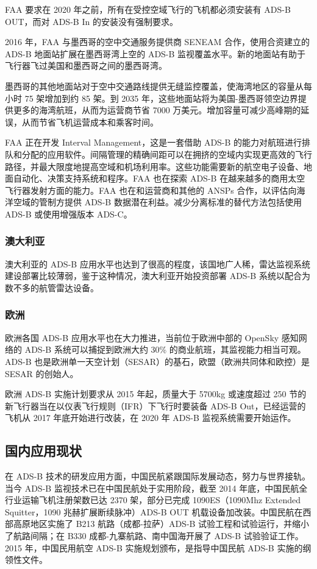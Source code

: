 FAA 要求在 2020 年之前，所有在受控空域飞行的飞机都必须安装有 ADS-B OUT，而对 ADS-B In 的安装没有强制要求。

2016 年，FAA 与墨西哥的空中交通服务提供商 SENEAM 合作，使用合资建立的 ADS-B 地面站扩展在墨西哥湾上空的 ADS-B 监视覆盖水平。新的地面站有助于飞行器飞过美国和墨西哥之间的墨西哥湾。

墨西哥的其他地面站对于空中交通路线提供无缝监控覆盖，使海湾地区的容量从每小时 75 架增加到约 85 架。到 2035 年，这些地面站将为美国-墨西哥领空边界提供更多的海湾航班，从而为运营商节省 7000 万美元。增加容量可减少高峰期的延误，从而节省飞机运营成本和乘客时间。

FAA 正在开发 Interval Management，这是一套借助 ADS-B 的能力对航班进行排队和分配的应用软件。间隔管理的精确间距可以在拥挤的空域内实现更高效的飞行路径，并最大限度地提高空域和机场利用率。这些功能需要新的航空电子设备、地面自动化、决策支持系统和程序。FAA 也在探索 ADS-B 在越来越多的商用太空飞行器发射方面的能力。FAA 也在和运营商和其他的 ANSPs 合作，以评估向海洋空域的管制方提供 ADS-B 数据潜在利益。减少分离标准的替代方法包括使用 ADS-B 或使用增强版本 ADS-C。

\subsubsection{澳大利亚}

澳大利亚的 ADS-B 应用水平也达到了很高的程度，该国地广人稀，雷达监视系统建设部署比较薄弱，鉴于这种情况，澳大利亚开始投资部署 ADS-B 系统以配合为数不多的航管雷达设备。

\subsubsection{欧洲}

欧洲各国 ADS-B 应用水平也在大力推进，当前位于欧洲中部的 OpenSky 感知网络的 ADS-B 系统可以捕捉到欧洲大约 30\% 的商业航班，其监视能力相当可观。ADS-B 也是欧洲单一天空计划（SESAR）的基石，欧盟（欧洲共同体和欧控）是 SESAR 的创始人。

欧洲 ADS-B 实施计划要求从 2015 年起，质量大于 5700kg 或速度超过 250 节的新飞行器当在以仪表飞行规则（IFR）下飞行时要装备 ADS-B Out，已经运营的飞机从 2017 年底开始进行改装，在 2020 年 ADS-B 监视系统需要开始运作。

\subsection{国内应用现状}

在 ADS-B 技术的研发应用方面，中国民航紧跟国际发展动态，努力与世界接轨。当今 ADS-B 监视技术已在中国民航处于实用阶段，截至 2014 年底，中国民航全行业运输飞机注册架数已达 2370 架，部分已完成 1090ES（1090Mhz Extended Squitter，1090 兆赫扩展断续脉冲）ADS-B OUT 机载设备加改装。中国民航在西部高原地区实施了 B213 航路（成都-拉萨）ADS-B 试验工程和试验运行，并缩小了航路间隔；在 B330 成都-九寨航路、南中国海开展了 ADS-B 试验验证工作。2015 年，中国民用航空 ADS-B 实施规划颁布，是指导中国民航 ADS-B 实施的纲领性文件。

